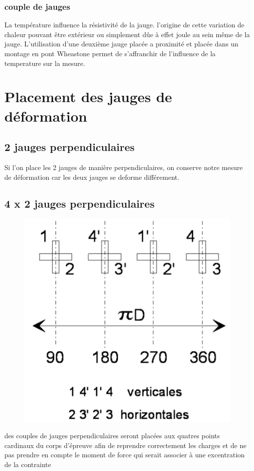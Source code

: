 \documentclass[10pt,a4paper]{report}
\begin{document}
\subsubsection*{couple de jauges}
La température influence la résistivité de la jauge. l'origine de cette variation de chaleur pouvant être extérieur ou simplement dûe à effet joule au sein même de la jauge. L'utilisation d'une deuxième jauge placée a proximité et placée dans un montage en pont Wheastone permet de s'affranchir de l'influence de la temperature sur la mesure.
\section{Placement des jauges de déformation}
\subsection{2 jauges perpendiculaires}
Si l'on place les 2 jauges de manière perpendiculaires, on conserve notre mesure de déformation car les deux jauges se deforme différement.
\subsection{4 x 2 jauges perpendiculaires}
\begin{figure}
\includegraphics[scale=0.2]{jauge.png} 
\end{figure}
des couples de jauges perpendiculaires seront placées aux quatres points cardinaux du corps d'épreuve afin de reprendre correctement les charges et de ne pas prendre en compte le moment de force qui serait associer à une excentration de la contrainte
\end{document}
